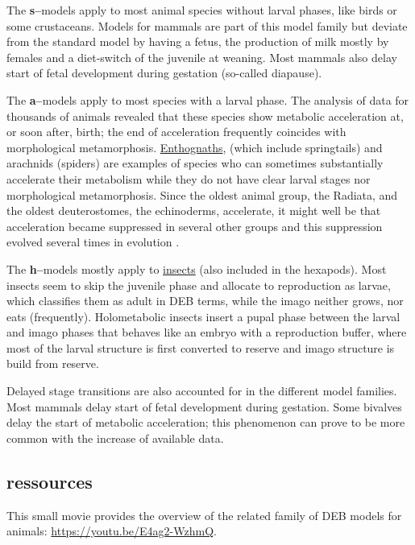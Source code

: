 The \textbf{s--}models apply to most animal species without larval phases, like birds or some crustaceans. 
Models for mammals are part of this model family but deviate from the standard model by having a fetus, the production of milk mostly by females and a diet-switch of the juvenile at weaning. 
Most mammals also delay start of fetal development during gestation (so-called diapause).

The \textbf{a--}models apply to most species with a larval phase. 
The analysis of data for thousands of animals revealed that these species show metabolic acceleration at, or soon after, birth; 
the end of acceleration frequently coincides with morphological metamorphosis.
\href{https://en.wikipedia.org/wiki/Entognatha}{Enthognaths}, (which include springtails) and arachnids (spiders) are examples of species who can sometimes substantially accelerate their metabolism while they do not have clear larval stages nor morphological metamorphosis.
Since the oldest animal group, the Radiata, and the oldest deuterostomes, the echinoderms, accelerate, it might well be that acceleration became  suppressed in several other groups and this suppression evolved several times in evolution \cite{Kooy2014}. 

The \textbf{h--}models mostly apply to \href{https://en.wikipedia.org/wiki/Insect}{insects} (also included in the hexapods). Most insects seem to skip the juvenile phase and allocate to reproduction as larvae, which classifies them as adult in DEB terms, while the imago neither grows, nor eats (frequently).
Holometabolic insects insert a pupal phase between the larval and imago phases that behaves like an embryo with a reproduction buffer, where most of the larval structure is first converted to reserve \cite{LlanMarq2015} and imago structure is build from reserve.

Delayed stage transitions are also accounted for in the different model families. 
Most mammals delay start of fetal development during gestation. 
Some bivalves delay the start of metabolic acceleration; 
this phenomenon can prove to be more common with the increase of available data.

\subsection{ressources}

This small movie provides the overview of the related family of DEB models for animals: \url{https://youtu.be/E4ag2-WzhmQ}.
